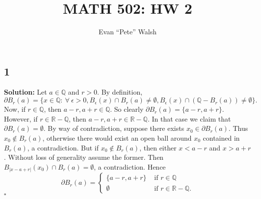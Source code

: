 \documentclass[12pt]{article}
\title{MATH 502: HW 2}
\author{Evan ``Pete'' Walsh}
\newcounter{ProofCounter}
\newenvironment{Solution}{\stepcounter{ProofCounter}\textbf{Solution:}}{\hfill$\square$}
\begin{document}
\maketitle

\subsection*{1}
\begin{Solution}
  Let $a\in \mathbb{Q}$ and $r > 0$. By definition,
  \[
    \partial B_r(a) = \{x \in \mathbb{Q} : \ \forall \ \epsilon > 0, B_{\epsilon}(x) \cap B_r(a) \neq \emptyset, B_{\epsilon}(x) \cap (\mathbb{Q} -
    B_r(a)) \neq \emptyset\}.
  \]
  Now, if $r \in \mathbb{Q}$, then $a - r, a + r \in \mathbb{Q}$. So clearly $\partial B_r(a) = \{a - r, a + r\}$. However, if $r \in \mathbb{R} -
  \mathbb{Q}$, then $a - r, a + r \in \mathbb{R} - \mathbb{Q}$. In that case we claim that $\partial B_r(a) = \emptyset$. By way of contradiction,
  suppose there exists $x_0 \in \partial B_r(a)$. Thus $x_0 \notin B_r(a)$, otherwise there would exist an open ball around $x_0$ contained in
  $B_r(a)$, a contradiction. But if $x_0 \notin B_r(a)$, then either $x < a - r$ and $x > a + r$. Without loss of generality assume the former. Then
  $B_{|x-a+r|}(x_0) \cap B_r(a) = \emptyset$, a contradiction. Hence
  \[
    \partial B_r(a) = \left\{ \begin{array}{cl}
        \{a - r, a + r\} & \text{ if } r \in \mathbb{Q} \\
        \emptyset & \text{ if } r \in \mathbb{R} - \mathbb{Q}.
    \end{array} \right.
  \]
\end{Solution}
\end{document}
